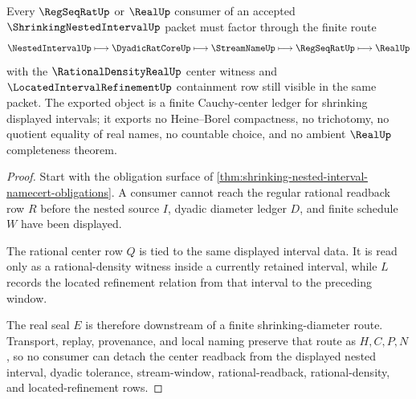 \begin{theorem}\label{thm:shrinking-nested-interval-cauchy-center-route}
Every $\RegSeqRatUp$ or $\RealUp$ consumer of an accepted $\ShrinkingNestedIntervalUp$ packet must factor through the finite route
$$
\NestedIntervalUp \longmapsto \DyadicRatCoreUp \longmapsto \StreamNameUp \longmapsto \RegSeqRatUp \longmapsto \RealUp
$$
with the $\RationalDensityRealUp$ center witness and $\LocatedIntervalRefinementUp$ containment row still visible in the same packet. The exported object is a finite Cauchy-center ledger for shrinking displayed intervals; it exports no Heine--Borel compactness, no trichotomy, no quotient equality of real names, no countable choice, and no ambient $\RealUp$ completeness theorem.
\end{theorem}
\begin{proof}
Start with the obligation surface of \autoref{thm:shrinking-nested-interval-namecert-obligations}. A consumer cannot reach the regular rational readback row $R$ before the nested source $I$, dyadic diameter ledger $D$, and finite schedule $W$ have been displayed.

The rational center row $Q$ is tied to the same displayed interval data. It is read only as a rational-density witness inside a currently retained interval, while $L$ records the located refinement relation from that interval to the preceding window.

The real seal $E$ is therefore downstream of a finite shrinking-diameter route. Transport, replay, provenance, and local naming preserve that route as $H,C,P,N$, so no consumer can detach the center readback from the displayed nested interval, dyadic tolerance, stream-window, rational-readback, rational-density, and located-refinement rows.
\end{proof}



